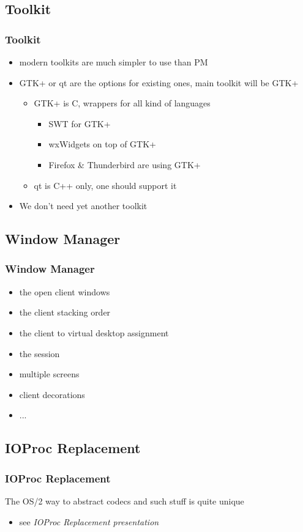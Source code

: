 \documentclass[handout]{beamer}
\begin{document}
\subsection{Toolkit}
\begin{frame}
\frametitle{Toolkit}
	\begin{itemize}
		\item modern toolkits are much simpler to use than PM
		\item GTK+ or qt are the options for existing ones, main toolkit will be GTK+
			\begin{itemize}
				\item GTK+ is C, wrappers for all kind of languages
				\begin{itemize}
					\item SWT for GTK+
					\item wxWidgets on top of GTK+
					\item Firefox \& Thunderbird are using GTK+
				\end{itemize}
				\item qt is C++ only, one should support it
			\end{itemize}
		\item We don't need yet another toolkit \texttrademark 
	\end{itemize}
\end{frame}

\subsection{Window Manager}
\begin{frame}
\frametitle{Window Manager}
	\begin{itemize}
      \item the open client windows
      \item the client stacking order
      \item the client to virtual desktop assignment
      \item the session
      \item multiple screens
      \item client decorations
      \item ...
	\end{itemize}
\end{frame}

\subsection{IOProc Replacement}
\begin{frame}
\frametitle{IOProc Replacement}
	The OS/2 way to abstract codecs and such stuff is quite unique
	\begin{itemize}
		\item see \it{IOProc Replacement} presentation
	\end{itemize}
\end{frame}
\end{document}
